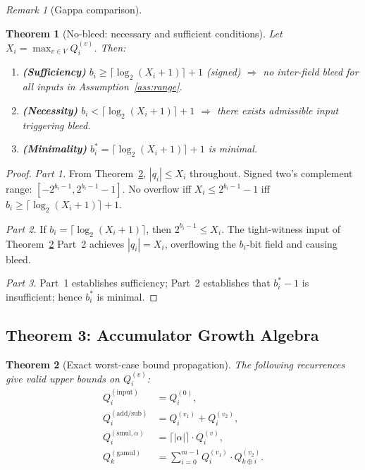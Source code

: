 \documentclass[11pt,a4paper]{article}
\theoremstyle{definition}
\theoremstyle{plain}
\newtheorem{theorem}{Theorem}[section]
\theoremstyle{remark}
\newtheorem{remark}{Remark}[section]
\newcommand{\ceil}[1]{\lceil #1 \rceil}
\begin{document}
\begin{remark}[Gappa comparison]
\begin{theorem}[No-bleed: necessary and sufficient conditions]
\label{thm:nobleed}
Let $X_i = \max_{v\in V} Q_i^{(v)}$.
Then:
\begin{enumerate}
  \item \textbf{(Sufficiency)} $b_i \ge \ceil{\log_2(X_i+1)}+1$ (signed)
        $\Rightarrow$ no inter-field bleed for all inputs in Assumption~\ref{ass:range}.
  \item \textbf{(Necessity)} $b_i < \ceil{\log_2(X_i+1)}+1$
        $\Rightarrow$ there exists admissible input triggering bleed.
  \item \textbf{(Minimality)} $b_i^* = \ceil{\log_2(X_i+1)}+1$ is minimal.
\end{enumerate}
\end{theorem}

\begin{proof}
\textit{Part 1.} From Theorem~\ref{thm:growth}, $|q_i|\le X_i$ throughout.
Signed two's complement range: $[-2^{b_i-1},2^{b_i-1}-1]$.
No overflow iff $X_i \le 2^{b_i-1}-1$ iff $b_i\ge\ceil{\log_2(X_i+1)}+1$.

\textit{Part 2.} If $b_i = \ceil{\log_2(X_i+1)}$, then $2^{b_i-1}\le X_i$.
The tight-witness input of Theorem~\ref{thm:growth} Part~2 achieves $|q_i|=X_i$, overflowing the $b_i$-bit field and causing bleed.

\textit{Part 3.} Part~1 establishes sufficiency; Part~2 establishes that
$b_i^*-1$ is insufficient; hence $b_i^*$ is minimal.
\end{proof}

\subsection{Theorem 3: Accumulator Growth Algebra}
\label{sec:growth}

\begin{theorem}[Exact worst-case bound propagation]
\label{thm:growth}
The following recurrences give valid upper bounds on $Q_i^{(v)}$:
\begin{align}
  Q_i^{(\mathrm{input})} &= Q_i^{(0)},\label{eq:rec-input}\\
  Q_i^{(\mathrm{add/sub})} &= Q_i^{(v_1)} + Q_i^{(v_2)},\label{eq:rec-add}\\
  Q_i^{(\mathrm{smul},\alpha)} &= \ceil{|\alpha|}\cdot Q_i^{(v)},\label{eq:rec-smul}\\
  Q_k^{(\mathrm{gamul})} &= \sum_{i=0}^{m-1} Q_i^{(v_1)}\cdot Q_{k\oplus i}^{(v_2)}.\label{eq:rec-gamul}
\end{align}


\end{theorem}
\end{remark}
\end{document}
